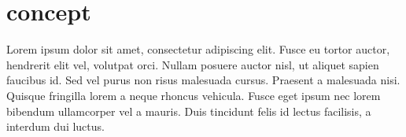 \chapter{concept}
\label{chap:concept}
Lorem ipsum dolor sit amet, consectetur adipiscing elit. Fusce eu tortor auctor,
hendrerit elit vel, volutpat orci. Nullam posuere auctor nisl, ut aliquet sapien
faucibus id. Sed vel purus non risus malesuada cursus. Praesent a malesuada
nisi. Quisque fringilla lorem a neque rhoncus vehicula. Fusce eget ipsum nec
lorem bibendum ullamcorper vel a mauris. Duis tincidunt felis id lectus
facilisis, a interdum dui luctus.